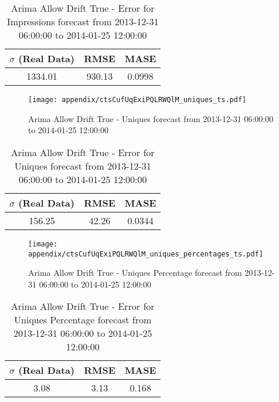 \begin{table}[H]
\centering
\footnotesize
\begin{tabular}{ccc}
$\sigma$ (Real Data) & RMSE & MASE   \\ \hline
1334.01 & 930.13 & 0.0998 \\
\end{tabular}

\vspace{0.5cm}

\caption{
Arima Allow Drift True - Error for Impressions forecast from 2013-12-31 06:00:00 to 2014-01-25 12:00:00}
\end{table}

\begin{figure}[H] \begin{center} \leavevmode
\texttt{[image: appendix/ctsCufUqExiPQLRWQlM\_uniques\_ts.pdf]} \caption{
Arima Allow Drift True - Uniques forecast from 2013-12-31 06:00:00 to 2014-01-25 12:00:00} \label{fig:appendix/ctsCufUqExiPQLRWQlM_uniques_ts.pdf} \end{center}
\end{figure}

\begin{table}[H]
\centering
\footnotesize
\begin{tabular}{ccc}
$\sigma$ (Real Data) & RMSE & MASE   \\ \hline
156.25 & 42.26 & 0.0344 \\
\end{tabular}

\vspace{0.5cm}

\caption{
Arima Allow Drift True - Error for Uniques forecast from 2013-12-31 06:00:00 to 2014-01-25 12:00:00}
\end{table}

\begin{figure}[H] \begin{center} \leavevmode
\texttt{[image: appendix/ctsCufUqExiPQLRWQlM\_uniques\_percentages\_ts.pdf]} \caption{
Arima Allow Drift True - Uniques Percentage forecast from 2013-12-31 06:00:00 to 2014-01-25 12:00:00} \label{fig:appendix/ctsCufUqExiPQLRWQlM_uniques_percentages_ts.pdf} \end{center}
\end{figure}

\begin{table}[H]
\centering
\footnotesize
\begin{tabular}{ccc}
$\sigma$ (Real Data) & RMSE & MASE   \\ \hline
3.08 & 3.13 & 0.168 \\
\end{tabular}

\vspace{0.5cm}

\caption{
Arima Allow Drift True - Error for Uniques Percentage forecast from 2013-12-31 06:00:00 to 2014-01-25 12:00:00}
\end{table}

